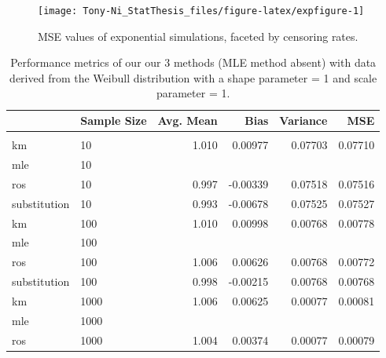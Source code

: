\documentclass[12pt, twoside]{amherstthesis}
\begin{document}
\begin{figure}

{\centering \texttt{[image: Tony-Ni\_StatThesis\_files/figure-latex/expfigure-1]} 

}

\caption{MSE values of exponential simulations, faceted by censoring rates.}\label{fig:expfigure}
\end{figure}
\begin{table}

\caption{\label{tab:wtable}Performance metrics of our our 3 methods 
             (MLE method absent) with data derived from the Weibull 
             distribution with a shape parameter = 1 and 
             scale parameter = 1.}
\centering
\fontsize{11.5}{13.5}\selectfont
\begin{tabular}[t]{llrrrr}
\toprule
  & Sample Size & Avg. Mean & Bias & Variance & MSE\\
\midrule
\addlinespace[0.3em]
\multicolumn{6}{l}{\textbf{Censoring Rate = 0.1}}\\
\hspace{1em}km & 10 & 1.010 & 0.00977 & 0.07703 & 0.07710\\
\hspace{1em}mle & 10 &  &  &  \vphantom{2} & \\
\hspace{1em}ros & 10 & 0.997 & -0.00339 & 0.07518 & 0.07516\\
\hspace{1em}substitution & 10 & 0.993 & -0.00678 & 0.07525 & 0.07527\\
\hline
\hspace{1em}km & 100 & 1.010 & 0.00998 & 0.00768 & 0.00778\\
\hspace{1em}mle & 100 &  &  &  \vphantom{2} & \\
\hspace{1em}ros & 100 & 1.006 & 0.00626 & 0.00768 & 0.00772\\
\hspace{1em}substitution & 100 & 0.998 & -0.00215 & 0.00768 & 0.00768\\
\hline
\hspace{1em}km & 1000 & 1.006 & 0.00625 & 0.00077 & 0.00081\\
\hspace{1em}mle & 1000 &  &  &  \vphantom{2} & \\
\hspace{1em}ros & 1000 & 1.004 & 0.00374 & 0.00077 & 0.00079\\

\end{tabular}
\end{table}
\end{document}
